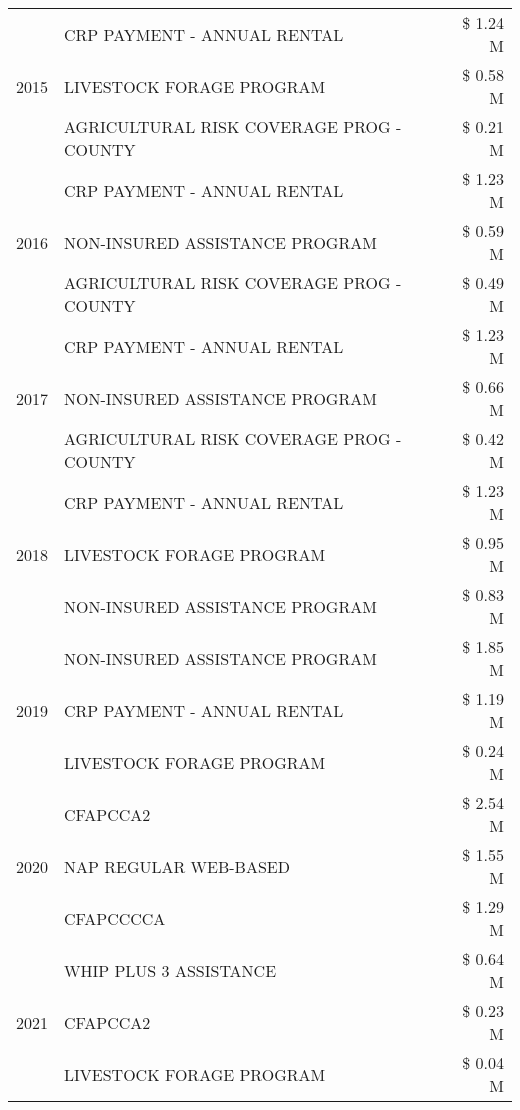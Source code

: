 \begin{tabular}{llr}
\cline{1-3}
\multirow[t]{3}{*}{2015} & CRP PAYMENT - ANNUAL RENTAL & \$ 1.24 M \\
 & LIVESTOCK FORAGE PROGRAM & \$ 0.58 M \\
 & AGRICULTURAL RISK COVERAGE PROG - COUNTY & \$ 0.21 M \\
\cline{1-3}
\multirow[t]{3}{*}{2016} & CRP PAYMENT - ANNUAL RENTAL                   & \$ 1.23 M \\
 & NON-INSURED ASSISTANCE PROGRAM                & \$ 0.59 M \\
 & AGRICULTURAL RISK COVERAGE PROG - COUNTY      & \$ 0.49 M \\
\cline{1-3}
\multirow[t]{3}{*}{2017} & CRP PAYMENT - ANNUAL RENTAL & \$ 1.23 M \\
 & NON-INSURED ASSISTANCE PROGRAM & \$ 0.66 M \\
 & AGRICULTURAL RISK COVERAGE PROG - COUNTY & \$ 0.42 M \\
\cline{1-3}
\multirow[t]{3}{*}{2018} & CRP PAYMENT - ANNUAL RENTAL & \$ 1.23 M \\
 & LIVESTOCK FORAGE PROGRAM & \$ 0.95 M \\
 & NON-INSURED ASSISTANCE PROGRAM & \$ 0.83 M \\
\cline{1-3}
\multirow[t]{3}{*}{2019} & NON-INSURED ASSISTANCE PROGRAM & \$ 1.85 M \\
 & CRP PAYMENT - ANNUAL RENTAL & \$ 1.19 M \\
 & LIVESTOCK FORAGE PROGRAM & \$ 0.24 M \\
\cline{1-3}
\multirow[t]{3}{*}{2020} & CFAPCCA2 & \$ 2.54 M \\
 & NAP REGULAR WEB-BASED & \$ 1.55 M \\
 & CFAPCCCCA & \$ 1.29 M \\
\cline{1-3}
\multirow[t]{3}{*}{2021} & WHIP PLUS 3 ASSISTANCE & \$ 0.64 M \\
 & CFAPCCA2 & \$ 0.23 M \\
 & LIVESTOCK FORAGE PROGRAM & \$ 0.04 M \\
\cline{1-3}
\bottomrule
\end{tabular}
